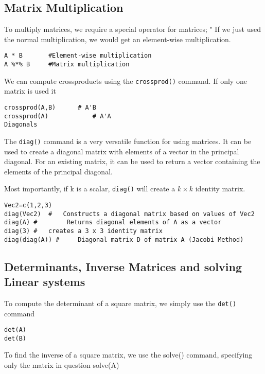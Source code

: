 \begin{enumerate}
\subsection{Matrix Multiplication}
To multiply matrices, we require a special operator for matrices; "%
If we just used the normal multiplication, we would get an element-wise multiplication.
\begin{framed}
\begin{verbatim}
A * B  		#Element-wise multiplication
A %*% B  	#Matrix multiplication
\end{verbatim}
\end{framed}
We can compute crossproducts using the \texttt{crossprod()} command. If only one matrix is used it
\begin{framed}
\begin{verbatim}
crossprod(A,B) 		# A'B
crossprod(A) 			# A'A
Diagonals
\end{verbatim}
\end{framed}
The \texttt{diag()} command is a very versatile function for using matrices.
It can be used to create a diagonal matrix with elements of a vector in the principal diagonal. For an existing matrix, it can be used to return a vector containing the elements of the principal diagonal.


Most importantly, if k is a scalar,  \texttt{diag()}  will create a $k \times k$ identity matrix.
\begin{framed}
\begin{verbatim}
Vec2=c(1,2,3)
diag(Vec2)	#	Constructs a diagonal matrix based on values of Vec2
diag(A)	#        Returns diagonal elements of A as a vector
diag(3)	#	creates a 3 x 3 identity matrix
diag(diag(A)) #  	Diagonal matrix D of matrix A (Jacobi Method)
\end{verbatim}
\end{framed}
\subsection{Determinants, Inverse Matrices and solving Linear systems}
To compute the determinant of a square matrix, we simply use the \texttt{det()} command
\begin{framed}
\begin{verbatim}
det(A)
det(B)
\end{verbatim}
\end{framed}
To find the inverse of a square matrix, we use the solve() command, specifying only the matrix in question
solve(A)


\end{enumerate}
